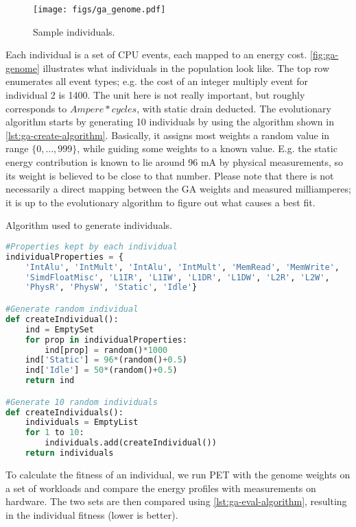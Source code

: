 \begin{figure}
    \centering
    \def\svgwidth{\columnwidth}
    \texttt{[image: figs/ga\_genome.pdf]}
    \caption{Sample individuals.}
    \label{fig:ga-genome}
\end{figure}

Each individual is a set of CPU events, each mapped to an energy cost.
\autoref{fig:ga-genome} illustrates what individuals in the population look
like. The top row enumerates all event types; e.g. the cost of an integer
multiply event for individual 2 is 1400. The unit here is not really important,
but roughly corresponds to $Ampere * cycles$, with static drain deducted. The
evolutionary algorithm starts by generating 10 individuals by using the
algorithm shown in \autoref{lst:ga-create-algorithm}. Basically, it assigns most
weights a random value in range $\{0, \ldots, 999\}$, while guiding some weights
to a known value. E.g. the static energy contribution is known to lie around 96
mA by physical measurements, so its weight is believed to be close to that
number. Please note that there is not necessarily a direct mapping between the
GA weights and measured milliamperes; it is up to the evolutionary algorithm to
figure out what causes a best fit.

\begin{algorithm}
\caption{Algorithm used to generate individuals.}
\label{lst:ga-create-algorithm}
\begin{lstlisting}[language=python,style=algo]
#Properties kept by each individual
individualProperties = {
    'IntAlu', 'IntMult', 'IntAlu', 'IntMult', 'MemRead', 'MemWrite',
    'SimdFloatMisc', 'L1IR', 'L1IW', 'L1DR', 'L1DW', 'L2R', 'L2W',
    'PhysR', 'PhysW', 'Static', 'Idle'}

#Generate random individual
def createIndividual():
    ind = EmptySet
    for prop in individualProperties:
        ind[prop] = random()*1000
    ind['Static'] = 96*(random()+0.5)
    ind['Idle'] = 50*(random()+0.5)
    return ind

#Generate 10 random individuals
def createIndividuals():
    individuals = EmptyList
    for 1 to 10:
        individuals.add(createIndividual())
    return individuals
\end{lstlisting}
\end{algorithm}

To calculate the fitness of an individual, we run PET with the genome weights on
a set of workloads and compare the energy profiles with measurements on
hardware. The two sets are then compared using \autoref{lst:ga-eval-algorithm},
resulting in the individual fitness (lower is better).


